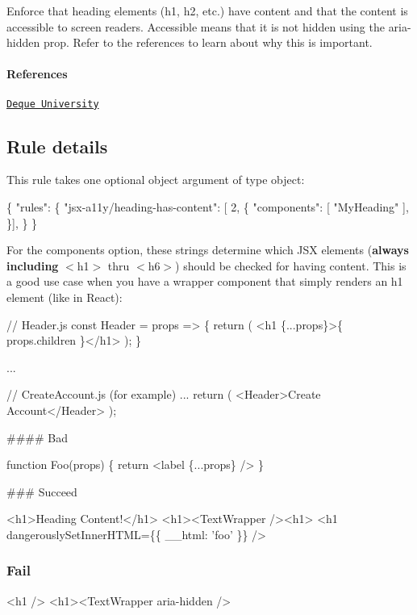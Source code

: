 Enforce that heading elements ({\ttfamily h1}, {\ttfamily h2}, etc.) have content and that the content is accessible to screen readers. Accessible means that it is not hidden using the {\ttfamily aria-\/hidden} prop. Refer to the references to learn about why this is important.

\paragraph*{References}


\begin{DoxyEnumerate}
\item \href{https://dequeuniversity.com/rules/axe/1.1/empty-heading}{\tt Deque University}
\end{DoxyEnumerate}

\subsection*{Rule details}

This rule takes one optional object argument of type object\+:


\begin{DoxyCode}
\{
    "rules": \{
        "jsx-a11y/heading-has-content": [ 2, \{
            "components": [ "MyHeading" ],
          \}],
    \}
\}
\end{DoxyCode}


For the {\ttfamily components} option, these strings determine which J\+SX elements ({\bfseries always including} {\ttfamily $<$h1$>$} thru {\ttfamily $<$h6$>$}) should be checked for having content. This is a good use case when you have a wrapper component that simply renders an {\ttfamily h1} element (like in React)\+:


\begin{DoxyCode}
// Header.js
const Header = props => \{
  return (
    <h1 \{...props\}>\{ props.children \}</h1>
  );
\}

...

// CreateAccount.js (for example)
...
return (
  <Header>Create Account</Header>
);
\end{DoxyCode}


\#\#\#\# Bad 
\begin{DoxyCode}
function Foo(props) \{
  return <label \{...props\} />
\}
\end{DoxyCode}


\#\#\# Succeed 
\begin{DoxyCode}
<h1>Heading Content!</h1>
<h1><TextWrapper /><h1>
<h1 dangerouslySetInnerHTML=\{\{ \_\_html: 'foo' \}\} />
\end{DoxyCode}


\subsubsection*{Fail}


\begin{DoxyCode}
<h1 />
<h1><TextWrapper aria-hidden />
\end{DoxyCode}
 